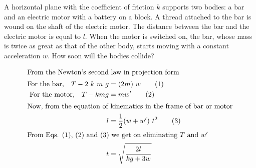 \item A horizontal plane with the coefficient of friction \( k \) supports two bodies: a bar and an electric motor with a battery on a block. A thread attached to the bar is wound on the shaft of the electric motor. The distance between the bar and the electric motor is equal to \( l \). When the motor is switched on, the bar, whose mass is twice as great as that of the other body, starts moving with a constant acceleration \( w \). How soon will the bodies collide?\begin{solution}
    \begin{center}
    \end{center}
    
    \begin{align*}
        \intertext{From the Newton’s second law in projection form}
        \text{For the bar,} \quad T - 2 \ k \ m \ g &= (2m) \ w \tag{1}\\
        \text{For the motor,} \quad T - kmg &= mw' \tag{2}\\
        \intertext{Now, from the equation of kinematics in the frame of bar or motor}
        l &= \frac{1}{2} (w + w') \ t^2 \tag{3}\\
        \intertext{From Eqs. (1), (2) and (3) we get on eliminating $T$ and $w'$}
        t &= \sqrt{\frac{2l}{kg + 3w}}
    \end{align*}
\end{solution}